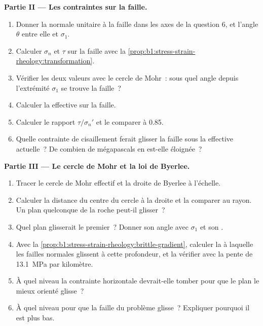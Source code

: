\begin{problem}
\medskip
\noindent\textbf{Partie II --- Les contraintes sur la faille.}
\begin{enumerate}[resume]
  \item Donner la normale unitaire à la faille dans les axes de la question 6, et
        l'angle $\theta$ entre elle et $\sigma_1$.
  \item Calculer $\sigma_n$ et $\tau$ sur la faille avec
        la \cref{prop:b1:stress-strain-rheology:transformation}.
  \item Vérifier les deux valeurs avec le cercle de Mohr~: sous quel angle depuis l'extrémité
        $\sigma_1$ se trouve la faille~?
  \item Calculer la  effective sur la faille.
  \item Calculer le rapport $\tau/\sigma_n'$ et le comparer à 0.85.
  \item Quelle contrainte de cisaillement ferait glisser la faille sous la  effective actuelle~? De combien de mégapascals en est-elle éloignée~?
\end{enumerate}

\medskip
\noindent\textbf{Partie III --- Le cercle de Mohr et la loi de Byerlee.}
\begin{enumerate}[resume]
  \item Tracer le cercle de Mohr effectif et la droite de Byerlee à l'échelle.
  \item Calculer la distance du centre du cercle à la droite et la
        comparer au rayon. Un plan quelconque de la roche peut-il glisser~?
  \item Quel plan glisserait le premier~? Donner son angle avec $\sigma_1$ et son .
  \item Avec la \cref{prop:b1:stress-strain-rheology:brittle-gradient}, calculer la
         à laquelle les failles normales glissent à cette profondeur, et
        la vérifier avec la pente de \qty{13.1}{MPa} par kilomètre.
  \item À quel niveau la contrainte horizontale devrait-elle tomber pour que le plan le mieux
        orienté glisse~?
  \item À quel niveau pour que la faille du problème glisse~? Expliquer pourquoi il est
        plus bas.
\end{enumerate}


\end{problem}
